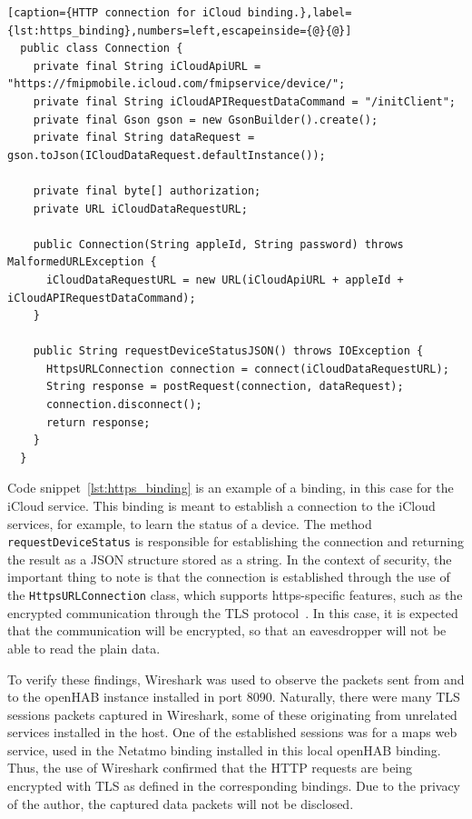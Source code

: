 \documentclass[12pt]{article}
\begin{document}
\newpage
\begin{lstlisting}[caption={HTTP connection for iCloud binding.},label={lst:https_binding},numbers=left,escapeinside={@}{@}]
  public class Connection {
    private final String iCloudApiURL = "https://fmipmobile.icloud.com/fmipservice/device/";
    private final String iCloudAPIRequestDataCommand = "/initClient";
    private final Gson gson = new GsonBuilder().create();
    private final String dataRequest = gson.toJson(ICloudDataRequest.defaultInstance());
    
    private final byte[] authorization;
    private URL iCloudDataRequestURL;
    
    public Connection(String appleId, String password) throws MalformedURLException {
      iCloudDataRequestURL = new URL(iCloudApiURL + appleId + iCloudAPIRequestDataCommand);
    } 
    
    public String requestDeviceStatusJSON() throws IOException {
      HttpsURLConnection connection = connect(iCloudDataRequestURL);
      String response = postRequest(connection, dataRequest);
      connection.disconnect();    
      return response;
    }
  }
\end{lstlisting}

Code snippet~\ref{lst:https_binding} is an example of a binding, in this case for the iCloud service. This binding is meant to establish a connection to the iCloud services, for example, to learn the status of a device. The method \texttt{requestDeviceStatus} is responsible for establishing the connection and returning the result as a JSON structure stored as a string. In the context of security, the important thing to note is that the connection is established through the use of the \texttt{HttpsURLConnection} class, which supports https-specific features, such as the encrypted communication through the TLS protocol~\cite{java_01}. In this case, it is expected that the communication will be encrypted, so that an eavesdropper will not be able to read the plain data.

To verify these findings, Wireshark was used to observe the packets sent from and to the openHAB instance installed in port 8090. Naturally, there were many TLS sessions packets captured in Wireshark, some of these originating from unrelated services installed in the host. One of the established sessions was for a maps web service, used in the Netatmo binding installed in this local openHAB binding. Thus, the use of Wireshark confirmed that the HTTP requests are being encrypted with TLS as defined in the corresponding bindings. Due to the privacy of the author, the captured data packets will not be disclosed. 
\end{document}
